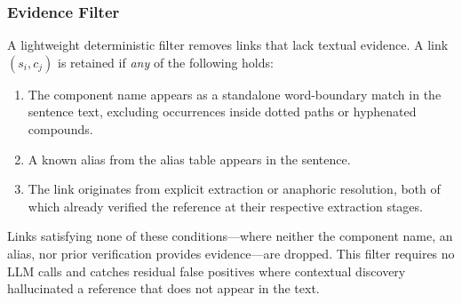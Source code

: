 \subsubsection{Evidence Filter}\label{sec:evidence-filter}

A lightweight deterministic filter removes links that lack textual
evidence.
A link $(s_i, c_j)$ is retained if \emph{any} of the following holds:

\begin{enumerate}
    \item The component name appears as a standalone word-boundary
      match in the sentence text, excluding occurrences inside dotted
      paths or hyphenated compounds.
    \item A known alias from the alias table appears in the sentence.
    \item The link originates from explicit extraction or anaphoric
      resolution, both of which already verified the reference at
      their respective extraction stages.
\end{enumerate}

\noindent Links satisfying none of these conditions---where neither
the component name, an alias, nor prior verification provides
evidence---are dropped.
This filter requires no LLM calls and catches residual false
positives where contextual discovery hallucinated a reference that
does not appear in the text.
